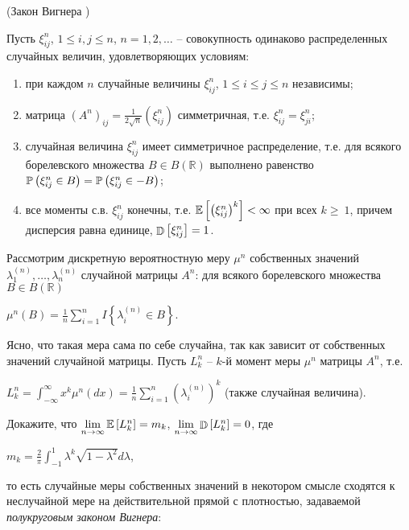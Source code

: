 \begin{problem}\Star(Закон Вигнера \cite{7})

Пусть $\xi _{ij}^{n} $, $1\le i,j\le n$, $n=1,2,\ldots $ -- совокупность одинаково распределенных случайных величин, удовлетворяющих условиям:

\begin{enumerate}
\item \label{zero}  при каждом $n$ случайные величины $\xi _{ij}^{n} $, $1\le i\le j\le n$ независимы;

\item \label{first}  матрица $\left(A^{n} \right)_{ij} =\frac{1}{2\sqrt{n} } \left(\xi _{ij}^{n} \right)$ симметричная, т.е. $\xi _{ij}^{n} =\xi _{ji}^{n} $;

\item \label{second} случайная величина $\xi _{ij}^{n} $ имеет симметричное распределение, т.е. для всякого борелевского множества $B\in B({\mathbb R})$ выполнено равенство $\mathrm{{\mathbb P}}\left(\xi _{ij}^{n} \in B\right)=\mathrm{{\mathbb P}}\left(\xi _{ij}^{n} \in -B\right)$;

\item \label{third} все моменты с.в. $\xi _{ij}^{n} $ конечны, т.е. $\mathrm{{\mathbb E}}\left[\left(\xi _{ij}^{n} \right)^{k} \right]<\infty $ при всех $k\ge~1$, причем дисперсия равна единице, $\mathop{\mathbb{D}}\nolimits\left[\xi _{ij}^{n} \right]=1$.
\end{enumerate}

Рассмотрим дискретную вероятностную меру $\mu ^{n} $ собственных значений $\lambda _{1}^{(n)} ,\ldots ,\lambda _{n}^{(n)} $ случайной матрицы $A^{n} $: для всякого борелевского множества $B\in B({\mathbb R})$
\begin{center}
$\mu ^{n} (B)=\frac{1}{n} \sum _{i=1}^{n}I\left\{\lambda _{i}^{(n)} \in B\right\} $. 
\end{center}
Ясно, что такая мера сама по себе случайна, так как зависит от собственных значений случайной матрицы. Пусть $L_{k}^{n} $ -- $k$-й момент меры $\mu ^{n} $ матрицы $A^{n} $, т.е. 
\begin{center}
$L_{k}^{n} =\int _{-\infty }^{\infty }x^{k} \mu ^{n} (dx) =\frac{1}{n} \sum _{i=1}^{n}\left(\lambda _{i}^{(n)} \right)^{k}  $ (также случайная величина).
\end{center}
Докажите, что $\mathop{\lim }\limits_{n\to \infty } \mathrm{{\mathbb E}}\left[L_{k}^{n} \right]=m_{k} $, $\mathop{\lim }\limits_{n\to \infty } \mathop{\mathbb{D}}\nolimits\left[L_{k}^{n} \right]=0$, где
\begin{center}
 $m_{k} =\frac{2}{\pi } \int _{-1}^{1}\lambda ^{k} \sqrt{1-\lambda ^{2} } d\lambda  $,
\end{center}
то есть случайные меры собственных значений в некотором смысле сходятся к неслучайной мере на действительной прямой с плотностью, задаваемой \textit{полукруговым законом Вигнера}: 


\end{problem}
